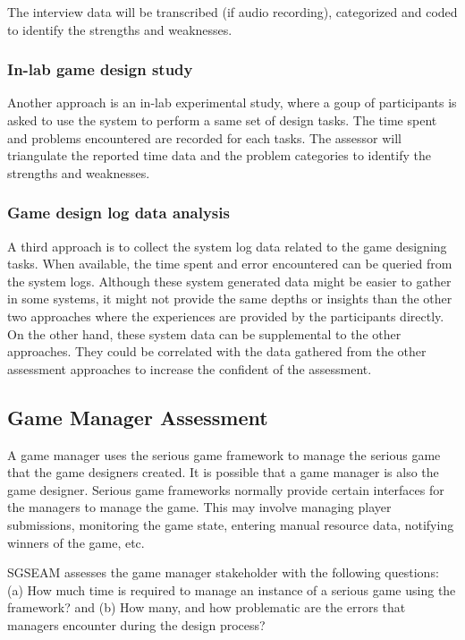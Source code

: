 \documentclass[11pt]{article}
\begin{document}
The interview data will be transcribed (if audio recording), categorized and coded to identify the
strengths and weaknesses.

\subsubsection{In-lab game design study}
\label{In-lab game design study}

Another approach is an in-lab experimental study, where a
goup of participants is asked to use the system to perform a same set of design tasks. The time
spent and problems encountered are recorded for each tasks. The assessor will triangulate the
reported time data and the problem categories to identify the strengths and weaknesses.

\subsubsection{Game design log data analysis}
\label{Game design log data analysis}

A third approach is to collect the system log data related to the game designing tasks. When
available, the time spent and error encountered can be queried from the system logs. Although these
system generated data might be easier to gather in some systems, it might not provide the same
depths or insights than the other two approaches where the experiences are provided by the
participants directly. On the other hand, these system data can be supplemental to the other
approaches. They could be correlated with the data gathered from the other assessment approaches
 to increase the confident of the assessment.

\subsection{Game Manager Assessment}

A game manager uses the serious game framework to manage the serious game that the game
designers created. It is possible that a game manager is also the game designer.
Serious game frameworks normally provide certain interfaces for the managers to manage the
game. This may involve managing player submissions, monitoring the game state, entering
manual resource data, notifying winners of the game, etc.

SGSEAM assesses the game manager stakeholder with the following questions: (a) How much time is
required to manage an instance of a serious game using the framework? and (b) How many,
and how problematic are the errors that managers encounter during the design process?
\end{document}
